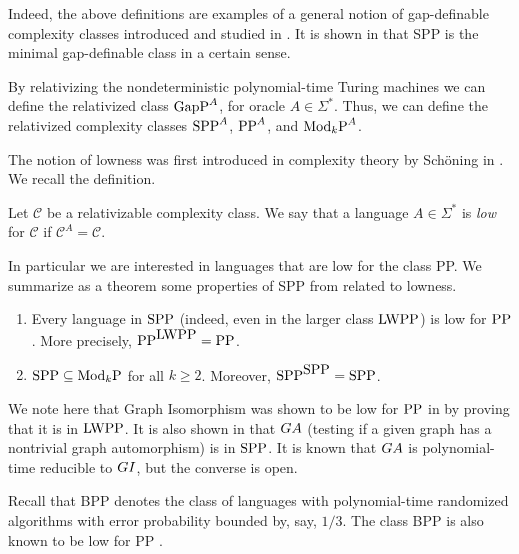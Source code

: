\documentclass{elsart}
\newcommand{\PP}{\mbox{\rm PP}}
\newcommand{\GapP}{\mbox{\rm GapP}}
\newcommand{\ModkP}{\mbox{\rm Mod$_k$P}}
\newcommand{\LWPP}{\mbox{\rm LWPP}}
\newcommand{\SPP}{\mbox{\rm SPP}}
\newcommand{\GA}{{\rm{GA}}}
\newcommand{\GI}{{\rm{GI}}}
\begin{document}
Indeed, the above definitions are examples of a general notion of
gap-definable complexity classes introduced and studied in
\cite{fenner91gapdefinable}. It is shown in
\cite{fenner91gapdefinable} that SPP is the minimal gap-definable
class in a certain sense.

By relativizing the nondeterministic polynomial-time Turing machines
we can define the relativized class $\GapP^A$, for oracle
$A\in\Sigma^*$. Thus, we can define the relativized complexity classes
$\SPP^A$, $\PP^A$, and $\ModkP^A$.

The notion of lowness was first introduced in complexity theory by
Sch\"oning in \cite{Sch83}. We recall the definition.

\begin{defn}
Let ${\mathcal C}$ be a relativizable complexity class. We say that
a language $A\in\Sigma^*$ is {\em low} for ${\mathcal C}$ if
${\mathcal C}^A={\mathcal C}$.
\end{defn}

In particular we are interested in languages that are low for the
class PP. We summarize as a theorem some properties of SPP from
\cite{fenner91gapdefinable} related to lowness.

\begin{thm}{}{\rm\cite{fenner91gapdefinable}}\label{SPP-self-low}
\begin{enumerate}
\item Every language in $\SPP$ (indeed, even in the larger class
  $\LWPP$) is low for $\PP$. More precisely, $\PP^{\LWPP}=\PP$.
\item $\SPP\subseteq\ModkP$ for all $k\geq 2$. Moreover,
  $\SPP^{\SPP}=\SPP$.
\end{enumerate}
\end{thm}

We note here that Graph Isomorphism was shown to be low for $\PP$ in
\cite{kobler92graph} by proving that it is in $\LWPP$. It is also
shown in \cite{kobler92graph} that $\GA$ (testing if a given graph has
a nontrivial graph automorphism) is in $\SPP$. It is known that $\GA$
is polynomial-time reducible to $\GI$, but the converse is open.

Recall that BPP denotes the class of languages with polynomial-time
randomized algorithms with error probability bounded by, say, $1/3$.
The class BPP is also known to be low for PP \cite{kobler92turing}.
\end{document}
